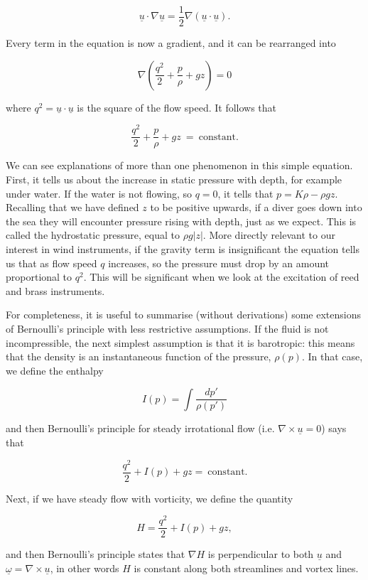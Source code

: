   $$\underline{u} \cdot \nabla \underline{u} = \frac{1}{2} \nabla 
  (\underline{u} \cdot \underline{u}) . \tag{24}$$ 

  Every term in the equation is now a gradient, and it can be rearranged into 

  $$\nabla \left(\dfrac{q^2}{2}+\dfrac{p}{\rho}+gz\right) = 0 \tag{25}$$ 

  where $q^2=\underline{u} \cdot \underline{u}$ is the square of the flow 
  speed. It follows that 

  $$\dfrac{q^2}{2}+\dfrac{p}{\rho}+gz\ = \mathrm{~constant.} \tag{26}$$ 

  We can see explanations of more than one phenomenon in this simple equation. 
  First, it tells us about the increase in static pressure with depth, for 
  example under water. If the water is not flowing, so $q=0$, it tells that 
  $p=K \rho-\rho g z$. Recalling that we have defined $z$ to be positive 
  upwards, if a diver goes down into the sea they will encounter pressure 
  rising with depth, just as we expect. This is called the hydrostatic 
  pressure, equal to $\rho g |z|$. More directly relevant to our interest in 
  wind instruments, if the gravity term is insignificant the equation tells us 
  that as flow speed $q$ increases, so the pressure must drop by an amount 
  proportional to $q^2$. This will be significant when we look at the 
  excitation of reed and brass instruments. 

  For completeness, it is useful to summarise (without derivations) some 
  extensions of Bernoulli's principle with less restrictive assumptions. If the 
  fluid is not incompressible, the next simplest assumption is that it is 
  barotropic: this means that the density is an instantaneous function of the 
  pressure, $\rho(p)$. In that case, we define the enthalpy 

  $$I(p)=\int{\dfrac{dp'}{\rho(p')}} \tag{27}$$ 

  and then Bernoulli's principle for steady irrotational flow (i.e. $\nabla 
  \times \underline{u}=0$) says that 

  $$\dfrac{q^2}{2}+I(p)+gz = \mathrm{~constant.} \tag{28}$$ 

  Next, if we have steady flow with vorticity, we define the quantity 

  $$H=\dfrac{q^2}{2}+I(p)+gz , \tag{29}$$ 

  and then Bernoulli's principle states that $\nabla H$ is perpendicular to 
  both $\underline{u}$ and $\underline{\omega} = \nabla \times \underline{u}$, 
  in other words $H$ is constant along both streamlines and vortex lines. 


